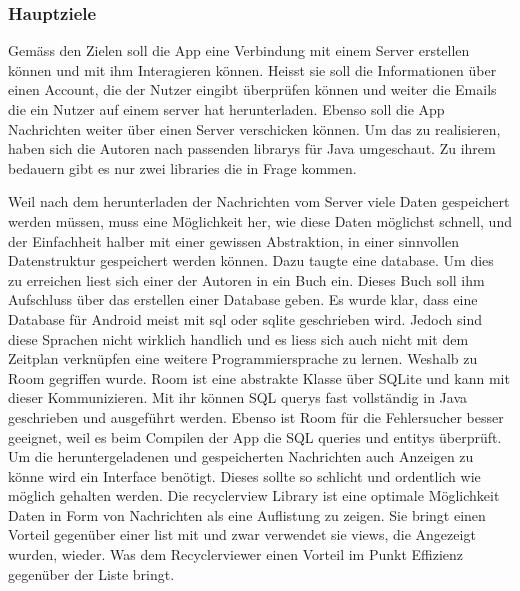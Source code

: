 \documentclass[a4paper,11pt]{article}
\begin{document}

\subsubsection{Hauptziele}
Gemäss den Zielen soll die App eine Verbindung mit einem Server erstellen können und mit ihm Interagieren können. Heisst sie soll die Informationen über einen Account, die der 
Nutzer eingibt überprüfen können und weiter die Emails die ein Nutzer auf einem \gls{server} hat herunterladen. Ebenso soll die App Nachrichten weiter über einen Server verschicken können. 
Um das zu realisieren, haben sich die Autoren nach passenden \glspl{library} für Java umgeschaut. Zu ihrem bedauern gibt es nur zwei libraries die in Frage kommen. 

Weil nach dem herunterladen der Nachrichten vom Server viele Daten gespeichert werden müssen, muss eine Möglichkeit her, wie diese Daten möglichst schnell, 
und der Einfachheit halber mit einer gewissen Abstraktion, in einer sinnvollen Datenstruktur gespeichert werden können. Dazu taugte eine \gls{database}. Um dies zu erreichen 
liest sich einer der Autoren in ein Buch ein. Dieses Buch soll ihm Aufschluss über das erstellen einer Database geben. 
Es wurde klar, dass eine Database für Android meist mit \gls{sql} oder \gls{sqlite} geschrieben wird. Jedoch sind diese Sprachen nicht wirklich handlich und es
liess sich auch nicht mit dem Zeitplan verknüpfen eine weitere Programmiersprache zu lernen. Weshalb zu Room gegriffen wurde. Room ist eine abstrakte Klasse über SQLite 
und kann mit dieser Kommunizieren. Mit ihr können SQL \glspl{query} fast vollständig in Java geschrieben und ausgeführt werden. Ebenso ist Room für die Fehlersucher besser geeignet, 
weil es beim Compilen der App die SQL queries und \glspl{entity} überprüft. \cite{roomInfo} \\

Um die heruntergeladenen und gespeicherten Nachrichten auch Anzeigen zu könne wird ein Interface benötigt. Dieses sollte so schlicht und ordentlich wie möglich gehalten werden. 
Die \gls{recyclerview} Library ist eine optimale Möglichkeit Daten in Form von Nachrichten als eine Auflistung zu zeigen. Sie bringt einen Vorteil gegenüber einer \gls{list} mit und zwar
verwendet sie \glspl{view}, die Angezeigt wurden, wieder. Was dem Recyclerviewer einen Vorteil im Punkt Effizienz gegenüber der Liste bringt. \cite{recyclerViewRecycle}
\end{document}
